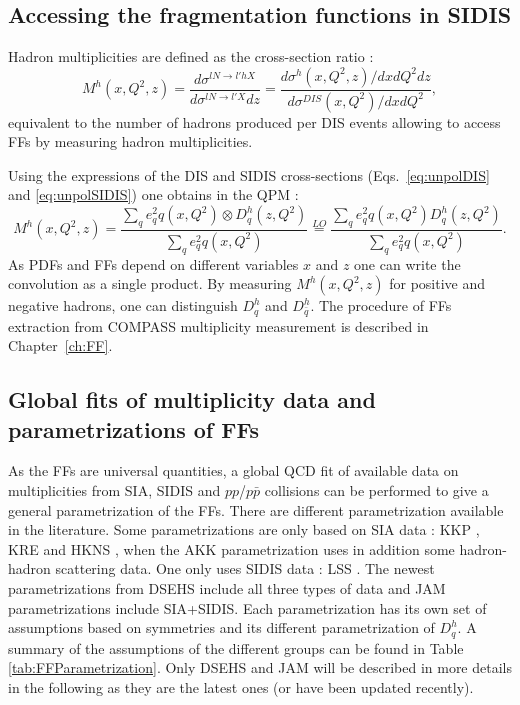 \subsection{Accessing the fragmentation functions in SIDIS}

Hadron multiplicities are defined as the cross-section ratio :
%
\begin{equation}
  M^h(x,Q^2,z) = \frac{d\sigma^{lN \rightarrow l'hX}}{d\sigma^{lN \rightarrow l'X}dz} = \frac{d\sigma^h(x,Q^2,z)/dxdQ^2dz}{d\sigma^{DIS}(x,Q^2)/dxdQ^2},
\end{equation}
%
equivalent to the number of hadrons produced per DIS events allowing to access FFs by measuring hadron multiplicities.

Using the expressions of the DIS and SIDIS cross-sections (Eqs.~\ref{eq:unpolDIS} and \ref{eq:unpolSIDIS}) one obtains in the QPM :
%
\begin{equation}\label{eq:MFFPDF}
  M^h(x,Q^2,z) = \frac{\sum_q e^2_q q(x,Q^2) \otimes D^h_q(z,Q^2)}{\sum_q e^2_q q(x,Q^2)} \stackrel{LO}{=} \frac{\sum_q e^2_q q(x,Q^2) D^h_q(z,Q^2)}{\sum_q e^2_q q(x,Q^2)}.
\end{equation}
%
As PDFs and FFs depend on different variables $x$ and $z$ one can write the convolution as a single product. By measuring $M^h(x,Q^2,z)$ for positive and negative hadrons, one can distinguish $D^h_q$ and $D^h_{\bar{q}}$. The procedure of FFs extraction from COMPASS multiplicity measurement is described in Chapter~\ref{ch:FF}.

\subsection{Global fits of multiplicity data and parametrizations of FFs}

As the FFs are universal quantities, a global QCD fit of available data on multiplicities from SIA, SIDIS and $pp$/$p\bar{p}$ collisions can be performed to give a general parametrization of the FFs. There are different parametrization available in the literature. Some parametrizations are only based on SIA data : KKP \cite{Universality}, KRE \cite{KRE} and HKNS \cite{HKNS}, when the AKK \cite{AKK} parametrization uses in addition some hadron-hadron scattering data. One only uses SIDIS data : LSS \cite{LSS}. The newest parametrizations from DSEHS \cite{DSEHS1,DSEHS2} include all three types of data and JAM \cite{JAM} parametrizations include SIA+SIDIS. Each parametrization has its own set of assumptions based on symmetries and its different parametrization of $D^h_q$. A summary of the assumptions of the different groups can be found in Table \ref{tab:FFParametrization}. Only DSEHS and JAM will be described in more details in the following as they are the latest ones (or have been updated recently).

